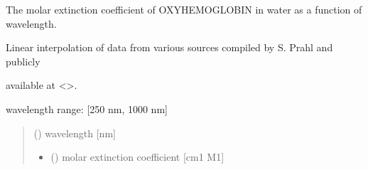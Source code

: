 \documentclass[letterpaper,10pt,english]{sphinxmanual}
\begin{document}

\begin{fulllineitems}
\label{\detokenize{03_absorption_coefficient:skinoptics.absorption_coefficient.molarext_oxy_Prahl}}
\pysigstartsignatures
{}
\pysigstopsignatures
\begin{DUlineblock}{0em}
\item[] The molar extinction coefficient of OXY\sphinxhyphen{}HEMOGLOBIN in water as a function of wavelength.
\item[] Linear interpolation of data from various sources compiled by S. Prahl and publicly
\item[] available at \textless{}\textgreater{}.
\end{DUlineblock}

\begin{DUlineblock}{0em}
\item[] wavelength range: {[}250 nm, 1000 nm{]}
\end{DUlineblock}
\begin{quote}\begin{description}
\sphinxAtStartPar
{} () \textendash{} wavelength {[}nm{]}

\sphinxAtStartPar
\begin{itemize}
\item {} 
\sphinxAtStartPar
{} () \textendash{} molar extinction coefficient {[}cm\sphinxhyphen{}1 M\sphinxhyphen{}1{]}

\end{itemize}


\end{description}\end{quote}

\end{fulllineitems}

\end{document}
